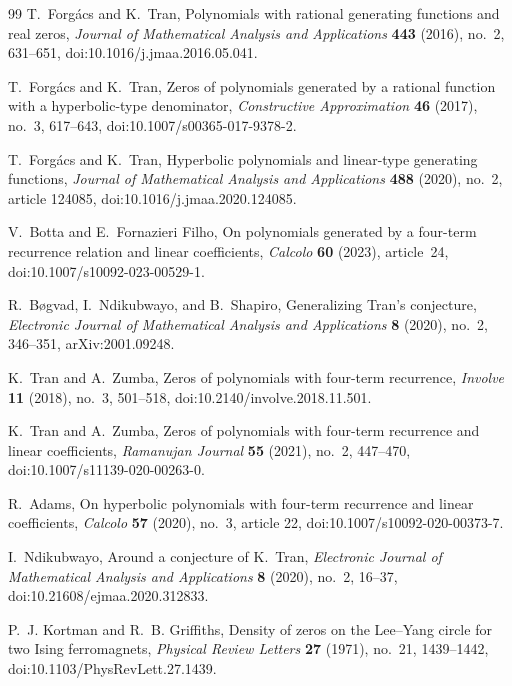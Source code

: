 \begin{thebibliography}{99}
T.~Forg\'acs and K.~Tran,
\newblock Polynomials with rational generating functions and real zeros,
\newblock \emph{Journal of Mathematical Analysis and Applications} \textbf{443} (2016), no.~2, 631--651,
\newblock doi:10.1016/j.jmaa.2016.05.041.

T.~Forg\'acs and K.~Tran,
\newblock Zeros of polynomials generated by a rational function with a hyperbolic-type denominator,
\newblock \emph{Constructive Approximation} \textbf{46} (2017), no.~3, 617--643,
\newblock doi:10.1007/s00365-017-9378-2.

T.~Forg\'acs and K.~Tran,
\newblock Hyperbolic polynomials and linear-type generating functions,
\newblock \emph{Journal of Mathematical Analysis and Applications} \textbf{488} (2020), no.~2, article 124085,
\newblock doi:10.1016/j.jmaa.2020.124085.

V.~Botta and E.~Fornazieri Filho,
\newblock On polynomials generated by a four-term recurrence relation and linear coefficients,
\newblock \emph{Calcolo} \textbf{60} (2023), article~24,
\newblock doi:10.1007/s10092-023-00529-1.

R.~B{\o}gvad, I.~Ndikubwayo, and B.~Shapiro,
\newblock Generalizing Tran's conjecture,
\newblock \emph{Electronic Journal of Mathematical Analysis and Applications} \textbf{8} (2020), no.~2, 346--351,
\newblock arXiv:2001.09248.

K.~Tran and A.~Zumba,
\newblock Zeros of polynomials with four-term recurrence,
\newblock \emph{Involve} \textbf{11} (2018), no.~3, 501--518,
\newblock doi:10.2140/involve.2018.11.501.

K.~Tran and A.~Zumba,
\newblock Zeros of polynomials with four-term recurrence and linear coefficients,
\newblock \emph{Ramanujan Journal} \textbf{55} (2021), no.~2, 447--470,
\newblock doi:10.1007/s11139-020-00263-0.

R.~Adams,
\newblock On hyperbolic polynomials with four-term recurrence and linear coefficients,
\newblock \emph{Calcolo} \textbf{57} (2020), no.~3, article 22,
\newblock doi:10.1007/s10092-020-00373-7.

I.~Ndikubwayo,
\newblock Around a conjecture of K.~Tran,
\newblock \emph{Electronic Journal of Mathematical Analysis and Applications} \textbf{8} (2020), no.~2, 16--37,
\newblock doi:10.21608/ejmaa.2020.312833.

P.~J. Kortman and R.~B. Griffiths,
\newblock Density of zeros on the Lee--Yang circle for two {I}sing ferromagnets,
\newblock \emph{Physical Review Letters} \textbf{27} (1971), no.~21, 1439--1442,
\newblock doi:10.1103/PhysRevLett.27.1439.

\end{thebibliography}
